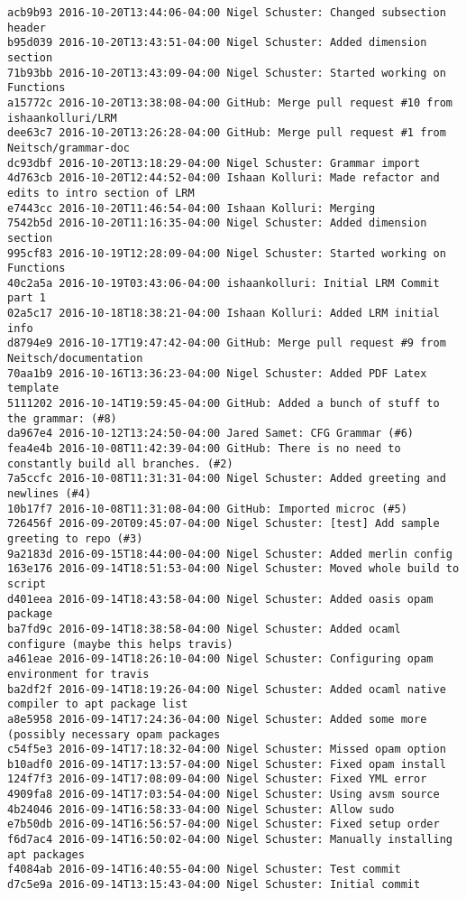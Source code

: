 \begin{lstlisting}
acb9b93 2016-10-20T13:44:06-04:00 Nigel Schuster: Changed subsection header
b95d039 2016-10-20T13:43:51-04:00 Nigel Schuster: Added dimension section
71b93bb 2016-10-20T13:43:09-04:00 Nigel Schuster: Started working on Functions
a15772c 2016-10-20T13:38:08-04:00 GitHub: Merge pull request #10 from ishaankolluri/LRM
dee63c7 2016-10-20T13:26:28-04:00 GitHub: Merge pull request #1 from Neitsch/grammar-doc
dc93dbf 2016-10-20T13:18:29-04:00 Nigel Schuster: Grammar import
4d763cb 2016-10-20T12:44:52-04:00 Ishaan Kolluri: Made refactor and edits to intro section of LRM
e7443cc 2016-10-20T11:46:54-04:00 Ishaan Kolluri: Merging
7542b5d 2016-10-20T11:16:35-04:00 Nigel Schuster: Added dimension section
995cf83 2016-10-19T12:28:09-04:00 Nigel Schuster: Started working on Functions
40c2a5a 2016-10-19T03:43:06-04:00 ishaankolluri: Initial LRM Commit part 1
02a5c17 2016-10-18T18:38:21-04:00 Ishaan Kolluri: Added LRM initial info
d8794e9 2016-10-17T19:47:42-04:00 GitHub: Merge pull request #9 from Neitsch/documentation
70aa1b9 2016-10-16T13:36:23-04:00 Nigel Schuster: Added PDF Latex template
5111202 2016-10-14T19:59:45-04:00 GitHub: Added a bunch of stuff to the grammar: (#8)
da967e4 2016-10-12T13:24:50-04:00 Jared Samet: CFG Grammar (#6)
fea4e4b 2016-10-08T11:42:39-04:00 GitHub: There is no need to constantly build all branches. (#2)
7a5ccfc 2016-10-08T11:31:31-04:00 Nigel Schuster: Added greeting and newlines (#4)
10b17f7 2016-10-08T11:31:08-04:00 GitHub: Imported microc (#5)
726456f 2016-09-20T09:45:07-04:00 Nigel Schuster: [test] Add sample greeting to repo (#3)
9a2183d 2016-09-15T18:44:00-04:00 Nigel Schuster: Added merlin config
163e176 2016-09-14T18:51:53-04:00 Nigel Schuster: Moved whole build to script
d401eea 2016-09-14T18:43:58-04:00 Nigel Schuster: Added oasis opam package
ba7fd9c 2016-09-14T18:38:58-04:00 Nigel Schuster: Added ocaml configure (maybe this helps travis)
a461eae 2016-09-14T18:26:10-04:00 Nigel Schuster: Configuring opam environment for travis
ba2df2f 2016-09-14T18:19:26-04:00 Nigel Schuster: Added ocaml native compiler to apt package list
a8e5958 2016-09-14T17:24:36-04:00 Nigel Schuster: Added some more (possibly necessary opam packages
c54f5e3 2016-09-14T17:18:32-04:00 Nigel Schuster: Missed opam option
b10adf0 2016-09-14T17:13:57-04:00 Nigel Schuster: Fixed opam install
124f7f3 2016-09-14T17:08:09-04:00 Nigel Schuster: Fixed YML error
4909fa8 2016-09-14T17:03:54-04:00 Nigel Schuster: Using avsm source
4b24046 2016-09-14T16:58:33-04:00 Nigel Schuster: Allow sudo
e7b50db 2016-09-14T16:56:57-04:00 Nigel Schuster: Fixed setup order
f6d7ac4 2016-09-14T16:50:02-04:00 Nigel Schuster: Manually installing apt packages
f4084ab 2016-09-14T16:40:55-04:00 Nigel Schuster: Test commit
d7c5e9a 2016-09-14T13:15:43-04:00 Nigel Schuster: Initial commit

\end{lstlisting}
